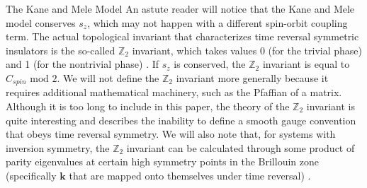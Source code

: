 \documentclass[a4paper,12pt]{article}
\renewcommand{\vec}[1]{\boldsymbol{\mathbf{#1}}}
\begin{document}
\begin{section}{The Kane and Mele Model}
An astute reader will notice that the Kane and Mele model conserves $s_z$, which may not happen with a different spin-orbit coupling term.  The actual topological invariant that characterizes time reversal symmetric insulators is the so-called $\mathbb{Z}_2$ invariant, which takes values 0 (for the trivial phase) and 1 (for the nontrivial phase) \cite{kane_mele_z2}.  If $s_z$ is conserved, the $\mathbb{Z}_2$ invariant is equal to $C_{spin} \text{ mod } 2$.  We will not define the $\mathbb{Z}_2$ invariant more generally because it requires additional mathematical machinery, such as the Pfaffian of a matrix.  Although it is too long to include in this paper, the theory of the $\mathbb{Z}_2$ invariant is quite interesting and describes the inability to define a smooth gauge convention that obeys time reversal symmetry.  We will also note that, for systems with inversion symmetry, the $\mathbb{Z}_2$ invariant can be calculated through some product of parity eigenvalues at certain high symmetry points in the Brillouin zone (specifically $\vec{k}$ that are mapped onto themselves under time reversal) \cite{fu_inversion}.

\end{section}
\end{document}

